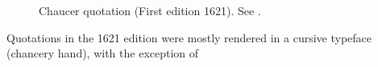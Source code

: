\begin{figure}[H]%
  \centering
    \caption*{\scriptsize{}\notefont{}Chaucer quotation (First edition 1621). See .}
  \label{fig:chaucer-first-edition}%
\end{figure}

Quotations in the 1621 edition were mostly rendered in a cursive typeface (chancery hand), with the exception of 
